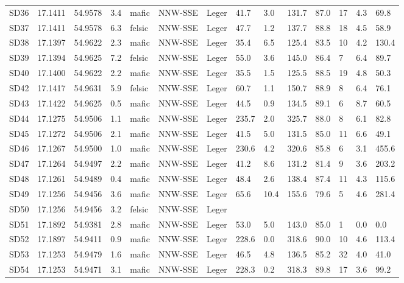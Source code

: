 \begin{tabular}{llllllllllllll}
SD36 & 17.1411 & 54.9578 & 3.4 & mafic & NNW-SSE & Leger & 41.7 & 3.0 & 131.7 & 87.0 & 17 & 4.3 & 69.8 \\
SD37 & 17.1411 & 54.9578 & 6.3 & felsic & NNW-SSE & Leger & 47.7 & 1.2 & 137.7 & 88.8 & 18 & 4.5 & 58.9 \\
SD38 & 17.1397 & 54.9622 & 2.3 & mafic & NNW-SSE & Leger & 35.4 & 6.5 & 125.4 & 83.5 & 10 & 4.2 & 130.4 \\
SD39 & 17.1394 & 54.9625 & 7.2 & felsic & NNW-SSE & Leger & 55.0 & 3.6 & 145.0 & 86.4 & 7 & 6.4 & 89.7 \\
SD40 & 17.1400 & 54.9622 & 2.2 & mafic & NNW-SSE & Leger & 35.5 & 1.5 & 125.5 & 88.5 & 19 & 4.8 & 50.3 \\
SD42 & 17.1417 & 54.9631 & 5.9 & felsic & NNW-SSE & Leger & 60.7 & 1.1 & 150.7 & 88.9 & 8 & 6.4 & 76.1 \\
SD43 & 17.1422 & 54.9625 & 0.5 & mafic & NNW-SSE & Leger & 44.5 & 0.9 & 134.5 & 89.1 & 6 & 8.7 & 60.5 \\
SD44 & 17.1275 & 54.9506 & 1.1 & mafic & NNW-SSE & Leger & 235.7 & 2.0 & 325.7 & 88.0 & 8 & 6.1 & 82.8 \\
SD45 & 17.1272 & 54.9506 & 2.1 & mafic & NNW-SSE & Leger & 41.5 & 5.0 & 131.5 & 85.0 & 11 & 6.6 & 49.1 \\
SD46 & 17.1267 & 54.9500 & 1.0 & mafic & NNW-SSE & Leger & 230.6 & 4.2 & 320.6 & 85.8 & 6 & 3.1 & 455.6 \\
SD47 & 17.1264 & 54.9497 & 2.2 & mafic & NNW-SSE & Leger & 41.2 & 8.6 & 131.2 & 81.4 & 9 & 3.6 & 203.2 \\
SD48 & 17.1261 & 54.9489 & 0.4 & mafic & NNW-SSE & Leger & 48.4 & 2.6 & 138.4 & 87.4 & 11 & 4.3 & 115.6 \\
SD49 & 17.1256 & 54.9456 & 3.6 & mafic & NNW-SSE & Leger & 65.6 & 10.4 & 155.6 & 79.6 & 5 & 4.6 & 281.4 \\
SD50 & 17.1256 & 54.9456 & 3.2 & felsic & NNW-SSE & Leger &  &  &  &  &  &  &  \\
SD51 & 17.1892 & 54.9381 & 2.8 & mafic & NNW-SSE & Leger & 53.0 & 5.0 & 143.0 & 85.0 & 1 & 0.0 & 0.0 \\
SD52 & 17.1897 & 54.9411 & 0.9 & mafic & NNW-SSE & Leger & 228.6 & 0.0 & 318.6 & 90.0 & 10 & 4.6 & 113.4 \\
SD53 & 17.1253 & 54.9479 & 1.6 & mafic & NNW-SSE & Leger & 46.5 & 4.8 & 136.5 & 85.2 & 32 & 4.0 & 41.0 \\
SD54 & 17.1253 & 54.9471 & 3.1 & mafic & NNW-SSE & Leger & 228.3 & 0.2 & 318.3 & 89.8 & 17 & 3.6 & 99.2 \\

\end{tabular}
